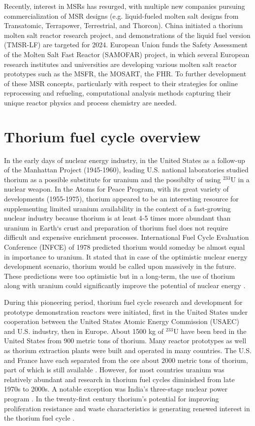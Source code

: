 Recently, interest in \glspl{MSR} has resurged, with multiple new companies pursuing commercialization of \gls{MSR} designs (e.g. liquid-fueled molten salt designs from Transatomic, Terrapower, Terrestrial, and Thorcon). China initiated a thorium molten salt reactor research project, and demonstrations of the liquid fuel version (TMSR-LF) are targeted for 2024. European Union funds the Safety Assessment of the Molten Salt Fast Reactor (SAMOFAR) project, in which several European research institutes and universities are developing various molten salt reactor prototypes such as the \gls{MSFR}, the \gls{MOSART}, the \gls{FHR}.
To further development of these \gls{MSR} concepts, particularly with respect to their strategies for online reprocessing and refueling, computational analysis methods capturing their unique reactor physics and process chemistry are needed.

\section{Thorium fuel cycle overview}
In the early days of nuclear energy industry, in the United States as a follow-up of the Manhattan Project (1945-1960), leading U.S. national laboratories studied thorium as a possible substitute for uranium and the possibilty of using $^{233}$U in a nuclear weapon. In the Atoms for Peace Program, with its great variety of developments (1955-1975), thorium appeared to be an interesting resource for supplementing limited uranium availability in the context of a fast-growing nuclear industry because thorium is  at least 4-5 times more abundant than uranium in Earth`s crust and preparation of thorium fuel does not require difficult and expensive enrichment processes. International Fuel Cycle Evaluation Conference (INFCE) of 1978 predicted thorium would someday be almost equal in importance to uranium. It stated that in case of the optimistic nuclear energy development scenario, thorium would be called upon massively in the future. These predictions were too optimistic but in a long-term, the use of thorium along with uranium could significantly improve the potential of nuclear energy \cite{lung_perspectives_1998}.

During this pioneering period, thorium fuel cycle research and development for prototype demonstration reactors were initiated, first in the United States under cooperation between the United States Atomic Energy Commission (USAEC) and U.S. industry, then in Europe. About 1500 kg of $^{233}$U have been bred in the United States from 900 metric tons of thorium. Many reactor prototypes as well as thorium extraction plants were built and operated in many countries. The U.S. and France have each separated from the ore about 2000 metric tons of thorium, part of which is still available \cite{lung_perspectives_1998}. However, for most countries uranium was relatively abundant and research in thorium fuel cycles diminished from late 1970s to 2000s. A notable exception was India's three-stage nuclear power program \cite{natarajan_fast_2007}. In the twenty-first century thorium's potential for improving proliferation resistance and waste characteristics is generating renewed interest in the thorium fuel cycle \cite{bagla_thorium_2015}.

